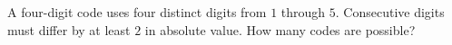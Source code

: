 A four-digit code uses four distinct digits from $1$ through $5$. Consecutive digits must differ by at least $2$ in absolute value. How many codes are possible?
